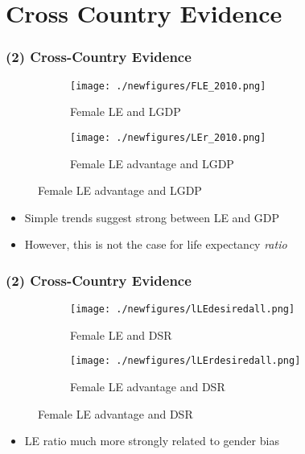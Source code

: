 \documentclass[10pt,letterpaper,subeqn]{beamer}
\begin{document}

\section{Cross Country Evidence}





\begin{frame}[label=CC1]
\frametitle{(2) Cross-Country Evidence}
\begin{figure}[htpb!]
\centering
\begin{subfigure}{.5\textwidth}
  \centering
  \texttt{[image: ./newfigures/FLE\_2010.png]}
  \caption{Female LE and LGDP}
  \label{TWINfig:fertrend}
\end{subfigure}%
\begin{subfigure}{.5\textwidth}
  \centering
  \texttt{[image: ./newfigures/LEr\_2010.png]}
  \caption{Female LE advantage and LGDP}
  \label{TWINfig:eductrend}
\end{subfigure}
\end{figure}
\begin{itemize}
\item Simple trends suggest strong between LE and GDP
\item However, this is not the case for life expectancy \emph{ratio}
\end{itemize}
\end{frame}


\begin{frame}[label=CC2]
\frametitle{(2) Cross-Country Evidence}
\begin{figure}[htpb!]
\centering
\begin{subfigure}{.5\textwidth}
  \centering
  \texttt{[image: ./newfigures/lLEdesiredall.png]}
  \caption{Female LE and DSR}
  \label{TWINfig:fertrend}
\end{subfigure}%
\begin{subfigure}{.5\textwidth}
  \centering
  \texttt{[image: ./newfigures/lLErdesiredall.png]}
  \caption{Female LE advantage and DSR}
  \label{TWINfig:eductrend}
\end{subfigure}
\end{figure}
\begin{itemize}
\item LE ratio much more strongly related to gender bias
\end{itemize}

\end{frame}
\end{document}
